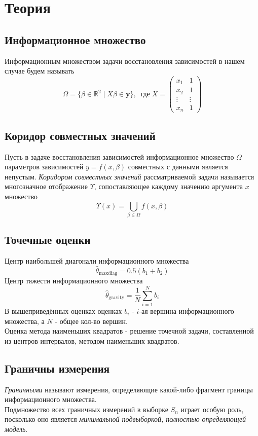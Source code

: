 \section{Теория}
\subsection{Информационное множество}
Информационным множеством задачи восстановления зависимостей в нашем случае будем называть
\begin{equation}
    \Omega=\{\beta\in\mathbb{R}^2\;|\;X\beta\in\mathbf{y}\}, \;\; \text{где}\; X=
    \begin{pmatrix}
x_1  &  1 \\
x_2  & 1 \\
\vdots & \vdots \\
x_n  &  1
\end{pmatrix}
\end{equation}
\subsection{Коридор совместных значений}
Пусть в задаче восстановления зависимостей информационное множество $\Omega$ параметров зависимостей $y=f(x,\beta)$ совместных с данными является непустым. \textit{Коридором совместных значений} рассматриваемой задачи называется многозначное отображение $\Upsilon$, сопоставляющее каждому значению аргумента $x$ множество
\begin{equation}
    \Upsilon(x)=\bigcup_{\beta\in\Omega}f(x,\beta)
\end{equation}
\subsection{Точечные оценки}
Центр наибольшей диагонали информационного множества
\begin{equation}
    \hat{\theta}_{\mathrm{maxdiag}} = 0.5(b_1 + b_2)
\end{equation}
Центр тяжести информационного множества
\begin{equation}
    \hat{\theta}_{\mathrm{gravity}} = \frac{1}{N} \sum_{i=1}^N b_i
\end{equation}
В вышеприведённых оценках оценках $b_i$ - $i$-ая вершина информационного множества, а $N$ - общее кол-во вершин.\\
Оценка метода наименьших квадратов - решение точечной задачи, составленной из центров интервалов, методом наименьших квадратов.
\subsection{Граничны измерения}
\textit{Граничными} называют измерения, определяющие какой-либо фрагмент границы информационного множества.\\
Подмножество всех граничных измерений в выборке $S_n$ играет особую роль, посколько оно является \textit{минимальной подвыборкой, полностью определяющей модель}. 